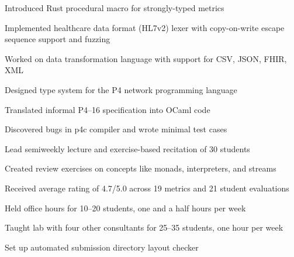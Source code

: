 \documentclass{resume}
\begin{document}
\begin{experience}
	\begin{description}
		\item Introduced Rust procedural macro for strongly-typed metrics
		\item Implemented healthcare data format (HL7v2) lexer with copy-on-write escape sequence support and fuzzing
		\item Worked on data transformation language with support for CSV, JSON, FHIR, XML
	\end{description}

	\begin{description}
		\item Designed type system for the P4 network programming language
		\item Translated informal P4--16 specification into OCaml code
		\item Discovered bugs in p4c compiler and wrote minimal test cases
	\end{description}

	\begin{description}
		\item Lead semiweekly lecture and exercise-based recitation of 30 students
		\item Created review exercises on concepts like monads, interpreters, and streams
		\item Received average rating of 4.7/5.0 across 19 metrics and 21 student evaluations
	\end{description}

	\begin{description}
		\item Held office hours for 10--20 students, one and a half hours per week
		\item Taught lab with four other consultants for 25--35 students, one hour per week
		\item Set up automated submission directory layout checker
	\end{description}
\end{experience}
\end{document}
